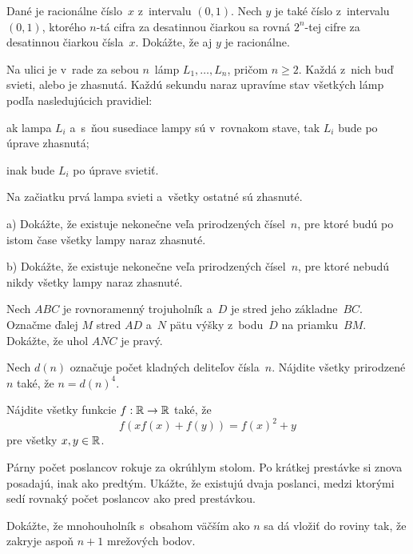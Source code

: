 {%
Dané je racionálne číslo~$x$ z~intervalu $(0,1)$. Nech $y$ je také číslo z~intervalu $(0,1)$, ktorého $n$-tá cifra za desatinnou čiarkou sa rovná $2^n$-tej cifre za desatinnou čiarkou čísla~$x$. Dokážte, že aj $y$ je racionálne.
}

{%
Na ulici je v~rade za sebou $n$~lámp $L_1,\dots,L_n$, pričom $n\ge2$. Každá z~nich buď svieti, alebo je zhasnutá. Každú sekundu naraz upravíme stav všetkých lámp podľa nasledujúcich pravidiel:
  \item ak lampa $L_i$ a~s~ňou susediace lampy sú v~rovnakom stave, tak $L_i$ bude po úprave zhasnutá;
  \item inak bude $L_i$ po úprave svietiť.

Na začiatku prvá lampa svieti a~všetky ostatné sú zhasnuté.
  \item{a)} Dokážte, že existuje nekonečne veľa prirodzených čísel~$n$, pre ktoré budú po istom čase všetky lampy naraz
    zhasnuté.
  \item{b)} Dokážte, že existuje nekonečne veľa prirodzených čísel~$n$, pre ktoré nebudú nikdy všetky lampy naraz zhasnuté.
}

{%
Nech $ABC$ je rovnoramenný trojuholník a~$D$ je stred jeho základne~$BC$. Označme ďalej $M$ stred $AD$ a~$N$ pätu výšky z~bodu~$D$ na priamku~$BM$. Dokážte, že uhol $ANC$ je pravý.}

{%
Nech $d(n)$ označuje počet kladných deliteľov čísla~$n$. Nájdite všetky prirodzené $n$ také, že $n=d(n)^4$.}

{%
Nájdite všetky funkcie $f:\Bbb R\to\Bbb R$ také, že
$$
f(xf(x) + f(y)) = f(x)^2 + y
$$
pre všetky $x,y \in \Bbb R$.}

{%
Párny počet poslancov rokuje za okrúhlym stolom. Po krátkej prestávke si znova posadajú, inak ako predtým. Ukážte, že existujú dvaja poslanci, medzi ktorými sedí rovnaký počet poslancov ako pred prestávkou.}

{%
Dokážte, že mnohouholník s~obsahom väčším ako $n$
sa dá vložiť do roviny tak, že zakryje aspoň $n+1$ mrežových
bodov.}

